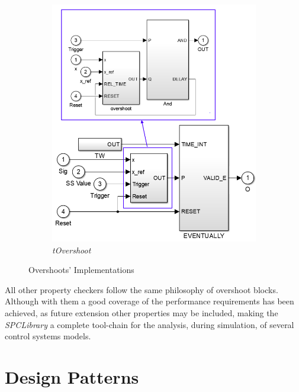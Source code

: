 \begin{figure}[!h]
\begin{subfigure}[b]{.48\textwidth}
\includegraphics[width=\textwidth]{Figs/tovimpl.png}
\caption{\textit{tOvershoot}}
\end{subfigure}
\caption{Overshoots' Implementations}
\label{fig:ovimpl}
\end{figure}

All other property checkers follow the same philosophy of overshoot blocks. Although with them a good coverage of the performance requirements has been achieved, as future extension other properties may be included, making the \textit{SPCLibrary} a complete tool-chain for the analysis, during simulation, of several control systems models.

\section{Design Patterns}
\label{sec:designpattern}


